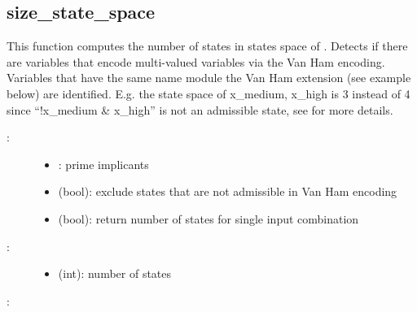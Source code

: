 \documentclass[letterpaper,10pt,english]{sphinxmanual}
\begin{document}
\subsection{size\_state\_space}
\label{\detokenize{StateTransitionGraphs:id19}}\label{\detokenize{StateTransitionGraphs:size-state-space}}

\begin{fulllineitems}
\label{\detokenize{StateTransitionGraphs:PyBoolNet.StateTransitionGraphs.size_state_space}}
This function computes the number of states in states space of .
Detects if there are variables that encode multi-valued variables via the Van Ham encoding.
Variables that have the same name module the Van Ham extension (see example below) are identified.
E.g. the state space of x\_medium, x\_high is 3 instead of 4 since “!x\_medium \& x\_high” is not an admissible state, see  for more details.
\begin{description}
\item[{:}] \leavevmode\begin{itemize}
\item {} 
: prime implicants

\item {} 
 (bool): exclude states that are not admissible in Van Ham encoding

\item {} 
 (bool): return number of states for single input combination

\end{itemize}

\item[{:}] \leavevmode\begin{itemize}
\item {} 
 (int): number of states

\end{itemize}

\end{description}

:


\end{fulllineitems}
\end{document}
